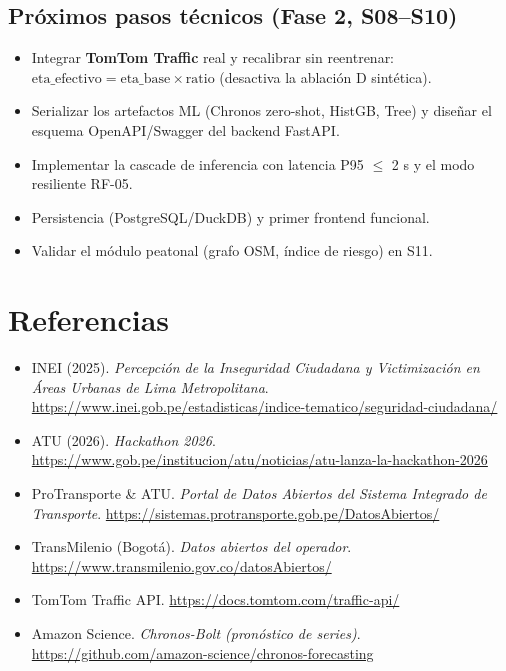 \documentclass[11pt]{article}
\begin{document}
\subsection{Próximos pasos técnicos (Fase 2, S08--S10)}
\begin{itemize}
  \item Integrar \textbf{TomTom Traffic} real y recalibrar sin reentrenar: $\text{eta\_efectivo} =
        \text{eta\_base} \times \text{ratio}$ (desactiva la ablación D sintética).
  \item Serializar los artefactos ML (Chronos zero-shot, HistGB, Tree) y diseñar el esquema
        OpenAPI/Swagger del backend FastAPI.
  \item Implementar la cascade de inferencia con latencia P95 $\leq$ 2 s y el modo resiliente RF-05.
  \item Persistencia (PostgreSQL/DuckDB) y primer frontend funcional.
  \item Validar el módulo peatonal (grafo OSM, índice de riesgo) en S11.
\end{itemize}

\section{Referencias}
\label{sec:referencias}
\begin{itemize}
  \item INEI (2025). \emph{Percepción de la Inseguridad Ciudadana y Victimización en Áreas Urbanas de
        Lima Metropolitana}. \url{https://www.inei.gob.pe/estadisticas/indice-tematico/seguridad-ciudadana/}
  \item ATU (2026). \emph{Hackathon 2026}.
        \url{https://www.gob.pe/institucion/atu/noticias/atu-lanza-la-hackathon-2026}
  \item ProTransporte \& ATU. \emph{Portal de Datos Abiertos del Sistema Integrado de Transporte}.
        \url{https://sistemas.protransporte.gob.pe/DatosAbiertos/}
  \item TransMilenio (Bogotá). \emph{Datos abiertos del operador}.
        \url{https://www.transmilenio.gov.co/datosAbiertos/}
  \item TomTom Traffic API. \url{https://docs.tomtom.com/traffic-api/}
  \item Amazon Science. \emph{Chronos-Bolt (pronóstico de series)}.
        \url{https://github.com/amazon-science/chronos-forecasting}
\end{itemize}
\end{document}
